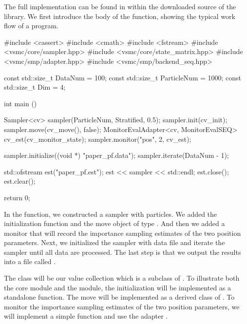 \documentclass[11pt, fontset=Minion, showoverfull,
bib, mintcode, minted=cache]{marticle}
\begin{document}
The full implementation can be found in
 within the downloaded source of
the library. We first introduce the body of the  function,
showing the typical work flow of a \vsmc program.
\begin{cppcode}
#include <cassert>
#include <cmath>
#include <fstream>
#include <vsmc/core/sampler.hpp>
#include <vsmc/core/state_matrix.hpp>
#include <vsmc/smp/adapter.hpp>
#include <vsmc/smp/backend_seq.hpp>

const std::size_t DataNum = 100;
const std::size_t ParticleNum = 1000;
const std::size_t Dim = 4;

int main ()
{
    Sampler<cv> sampler(ParticleNum, Stratified, 0.5);
    sampler.init(cv_init);
    sampler.move(cv_move(), false);
    MonitorEvalAdapter<cv, MonitorEvalSEQ> cv_est(cv_monitor_state);
    sampler.monitor("pos", 2, cv_est);

    sampler.initialize((void *) "paper_pf.data");
    sampler.iterate(DataNum - 1);

    std::ofstream est("paper_pf.est");
    est << sampler << std::endl;
    est.close();
    est.clear();

    return 0;
}
\end{cppcode}
In the  function, we constructed a sampler with
 particles. We added the initialization function
 and the move object of type . And then
we added a monitor that will record the importance sampling estimates of the
two position parameters. Next, we initialized the sampler with data file
 and iterate the sampler until all data are
processed. The last step is that we output the results into a file called
.

The class  will be our value collection which is a subclass of
. To illustrate both the core
module and the \smp module, the initialization  will be
implemented as a standalone function. The move  will be
implemented as a derived class of . To monitor the
importance sampling estimates of the two position parameters, we will
implement a simple function  and use the adapter
.
\end{document}
